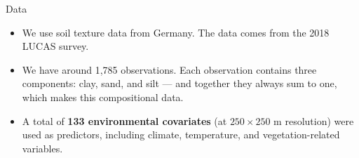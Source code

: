


\begin{frame}{ Data}

\begin{itemize}[label=\textbullet]
    \item We use soil texture data from Germany. The data comes from the 2018 LUCAS survey.
    
    \vspace{0.5em}
    
    \item We have around 1,785 observations. Each observation contains three components: clay, sand, and silt — and together they always sum to one, which makes this compositional data.
    

  
    
    \vspace{0.5em}
    
    \item A total of \textbf{133 environmental covariates} (at $250 \times 250$ m resolution) were used as predictors, including climate, temperature, and vegetation-related variables.
    
    \vspace{0.5em}
   
\end{itemize}

\end{frame}




